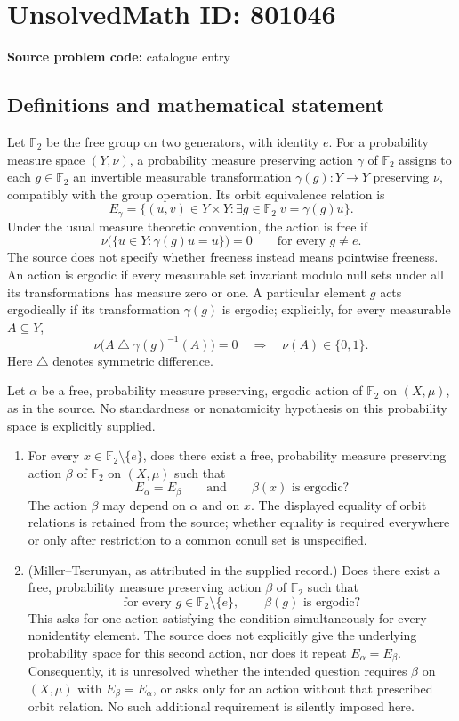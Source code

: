\documentclass[11pt]{article}
\begin{document}
\section*{UnsolvedMath ID: 801046}
\textbf{Source problem code:} catalogue entry
\subsection{Definitions and mathematical statement}
Let \(\mathbb F_2\) be the free group on two generators, with identity \(e\). For a probability measure space \((Y,\nu)\), a probability measure preserving action \(\gamma\) of \(\mathbb F_2\) assigns to each \(g\in\mathbb F_2\) an invertible measurable transformation \(\gamma(g):Y\to Y\) preserving \(\nu\), compatibly with the group operation. Its orbit equivalence relation is
\[
E_\gamma=\{(u,v)\in Y\times Y:\exists g\in\mathbb F_2\; v=\gamma(g)u\}.
\]
Under the usual measure theoretic convention, the action is free if
\[
\nu\bigl(\{u\in Y:\gamma(g)u=u\}\bigr)=0
\qquad\text{for every }g\ne e.
\]
The source does not specify whether freeness instead means pointwise freeness. An action is ergodic if every measurable set invariant modulo null sets under all its transformations has measure zero or one. A particular element \(g\) acts ergodically if its transformation \(\gamma(g)\) is ergodic; explicitly, for every measurable \(A\subseteq Y\),
\[
\nu\bigl(A\mathbin{\triangle}\gamma(g)^{-1}(A)\bigr)=0
\quad\Longrightarrow\quad
\nu(A)\in\{0,1\}.
\]
Here \(\triangle\) denotes symmetric difference.

Let \(\alpha\) be a free, probability measure preserving, ergodic action of \(\mathbb F_2\) on \((X,\mu)\), as in the source. No standardness or nonatomicity hypothesis on this probability space is explicitly supplied.
\begin{enumerate}
\item For every \(x\in\mathbb F_2\setminus\{e\}\), does there exist a free, probability measure preserving action \(\beta\) of \(\mathbb F_2\) on \((X,\mu)\) such that
\[
E_\alpha=E_\beta
\qquad\text{and}\qquad
\beta(x)\text{ is ergodic}?
\]
The action \(\beta\) may depend on \(\alpha\) and on \(x\). The displayed equality of orbit relations is retained from the source; whether equality is required everywhere or only after restriction to a common conull set is unspecified.
\item \textup{(Miller--Tserunyan, as attributed in the supplied record.)} Does there exist a free, probability measure preserving action \(\beta\) of \(\mathbb F_2\) such that
\[
\text{for every }g\in\mathbb F_2\setminus\{e\},
\qquad \beta(g)\text{ is ergodic}?
\]
This asks for one action satisfying the condition simultaneously for every nonidentity element. The source does not explicitly give the underlying probability space for this second action, nor does it repeat \(E_\alpha=E_\beta\). Consequently, it is unresolved whether the intended question requires \(\beta\) on \((X,\mu)\) with \(E_\beta=E_\alpha\), or asks only for an action without that prescribed orbit relation. No such additional requirement is silently imposed here.
\end{enumerate}
\end{document}
